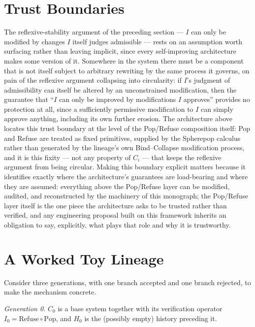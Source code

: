 \documentclass[11pt]{book}
\begin{document}
\section{Trust Boundaries}

The reflexive-stability argument of the preceding section --- $I$ can only be modified by changes $I$ itself judges admissible --- rests on an assumption worth surfacing rather than leaving implicit, since every self-improving architecture makes some version of it. Somewhere in the system there must be a component that is not itself subject to arbitrary rewriting by the same process it governs, on pain of the reflexive argument collapsing into circularity: if $I$'s judgment of admissibility can itself be altered by an unconstrained modification, then the guarantee that ``$I$ can only be improved by modifications $I$ approves'' provides no protection at all, since a sufficiently permissive modification to $I$ can simply approve anything, including its own further erosion. The architecture above locates this trust boundary at the level of the Pop/Refuse composition itself: Pop and Refuse are treated as fixed primitives, supplied by the Spherepop calculus rather than generated by the lineage's own Bind--Collapse modification process, and it is this fixity --- not any property of $C_i$ --- that keeps the reflexive argument from being circular. Making this boundary explicit matters because it identifies exactly where the architecture's guarantees are load-bearing and where they are assumed: everything above the Pop/Refuse layer can be modified, audited, and reconstructed by the machinery of this monograph; the Pop/Refuse layer itself is the one piece the architecture asks to be trusted rather than verified, and any engineering proposal built on this framework inherits an obligation to say, explicitly, what plays that role and why it is trustworthy.

\section{A Worked Toy Lineage}

Consider three generations, with one branch accepted and one branch rejected, to make the mechanism concrete.

\emph{Generation 0.} $C_0$ is a base system together with its verification operator $I_0 = \mathrm{Refuse}\circ\mathrm{Pop}$, and $H_0$ is the (possibly empty) history preceding it.
\end{document}
